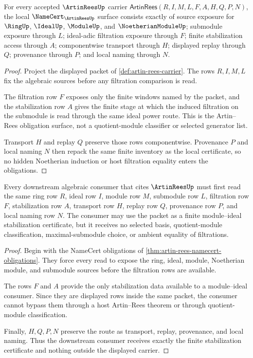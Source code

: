 \begin{theorem}
\label{thm:artin-rees-namecert-obligations}
For every accepted $\ArtinReesUp$ carrier $\mathsf{ArtinRees}(R,I,M,L,F,A,H,Q,P,N)$, the local $\NameCert_{\ArtinReesUp}$ surface consists exactly of source exposure for $\RingUp$, $\IdealUp$, $\ModuleUp$, and $\NoetherianModuleUp$; submodule exposure through $L$; ideal-adic filtration exposure through $F$; finite stabilization access through $A$; componentwise transport through $H$; displayed replay through $Q$; provenance through $P$; and local naming through $N$.
\end{theorem}
\begin{proof}
Project the displayed packet of \autoref{def:artin-rees-carrier}. The rows $R,I,M,L$ fix the algebraic sources before any filtration comparison is read.

The filtration row $F$ exposes only the finite windows named by the packet, and the stabilization row $A$ gives the finite stage at which the induced filtration on the submodule is read through the same ideal power route. This is the Artin--Rees obligation surface, not a quotient-module classifier or selected generator list.

Transport $H$ and replay $Q$ preserve those rows componentwise. Provenance $P$ and local naming $N$ then repack the same finite inventory as the local certificate, so no hidden Noetherian induction or host filtration equality enters the obligations.
\end{proof}

\begin{theorem}
\label{thm:artin-rees-module-ideal-consumer}
Every downstream algebraic consumer that cites $\ArtinReesUp$ must first read the same ring row $R$, ideal row $I$, module row $M$, submodule row $L$, filtration row $F$, stabilization row $A$, transport row $H$, replay row $Q$, provenance row $P$, and local naming row $N$. The consumer may use the packet as a finite module--ideal stabilization certificate, but it receives no selected basis, quotient-module classification, maximal-submodule choice, or ambient equality of filtrations.
\end{theorem}
\begin{proof}
Begin with the NameCert obligations of \autoref{thm:artin-rees-namecert-obligations}. They force every read to expose the ring, ideal, module, Noetherian module, and submodule sources before the filtration rows are available.

The rows $F$ and $A$ provide the only stabilization data available to a module--ideal consumer. Since they are displayed rows inside the same packet, the consumer cannot bypass them through a host Artin--Rees theorem or through quotient-module classification.

Finally, $H,Q,P,N$ preserve the route as transport, replay, provenance, and local naming. Thus the downstream consumer receives exactly the finite stabilization certificate and nothing outside the displayed carrier.
\end{proof}

